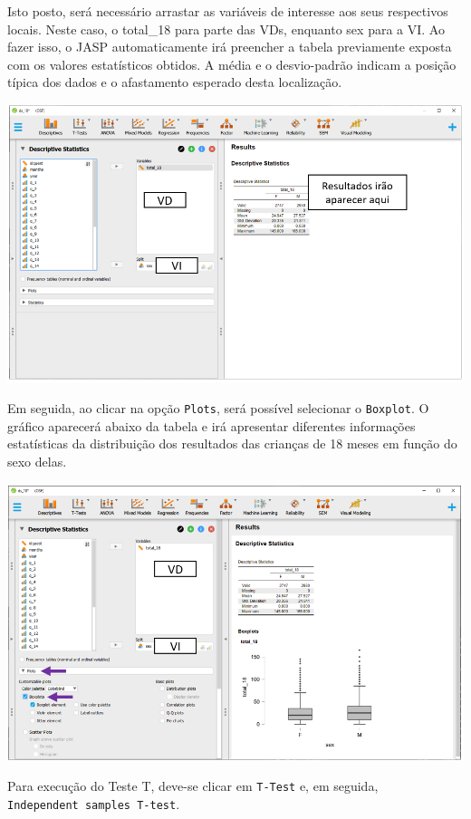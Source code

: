 \documentclass[
]{book}
\begin{document}
Isto posto, será necessário arrastar as variáveis de interesse aos seus respectivos locais. Neste caso, o total\_18 para parte das VDs, enquanto sex para a VI. Ao fazer isso, o JASP automaticamente irá preencher a tabela previamente exposta com os valores estatísticos obtidos. A média e o desvio-padrão indicam a posição típica dos dados e o afastamento esperado desta localização.

\includegraphics{./img/cap_testet_tabela_descritiva.png}

Em seguida, ao clicar na opção \texttt{Plots}, será possível selecionar o \texttt{Boxplot}. O gráfico aparecerá abaixo da tabela e irá apresentar diferentes informações estatísticas da distribuição dos resultados das crianças de 18 meses em função do sexo delas.

\includegraphics{./img/cap_testet_tabela.png}

Para execução do Teste T, deve-se clicar em \texttt{T-Test} e, em seguida, \texttt{Independent\ samples\ T-test}.
\end{document}
